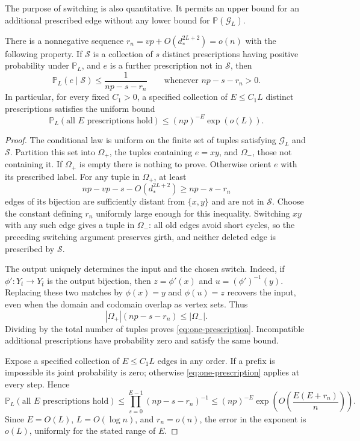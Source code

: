The purpose of switching is also quantitative.  It permits an upper
bound for an additional prescribed edge without any lower bound for
\(\mathbb P(\mathcal G_L)\).

\begin{lemma}\label{lem:prescriptions}
There is a nonnegative sequence
\(r_n=vp+O(d_*^{2L+2})=o(n)\) with the following property.  If
\(\mathcal S\) is a collection of \(s\) distinct prescriptions
having positive probability under \(\mathbb P_L\), and \(e\) is
a further prescription not in \(\mathcal S\), then
\begin{equation}\label{eq:one-prescription}
 \mathbb P_L(e\mid\mathcal S)
 \le\frac1{np-s-r_n}
 \qquad\text{whenever }np-s-r_n>0.
\end{equation}
In particular, for every fixed \(C_1>0\), a specified collection of
\(E\le C_1L\) distinct prescriptions satisfies the uniform bound
\begin{equation}\label{eq:short-prescriptions}
 \mathbb P_L(\text{all }E\text{ prescriptions hold})
 \le (np)^{-E}\exp(o(L)).
\end{equation}
\end{lemma}

\begin{proof}
The conditional law is uniform on the finite set of tuples satisfying
\(\mathcal G_L\) and \(\mathcal S\).  Partition this set into
\(\Omega_+\), the tuples containing \(e=xy\), and \(\Omega_-\),
those not containing it.  If \(\Omega_+\) is empty there is nothing
to prove.  Otherwise orient \(e\) with its prescribed label.
For any tuple in \(\Omega_+\), at least
\[
 np-vp-s-O(d_*^{2L+2})\ge np-s-r_n
\]
edges of its bijection are sufficiently distant from \(\{x,y\}\)
and are not in \(\mathcal S\).  Choose the constant defining \(r_n\)
uniformly large enough for this inequality.  Switching \(xy\) with
any such edge gives a tuple in \(\Omega_-\): all old edges avoid
short cycles, so the preceding switching argument preserves girth,
and neither deleted edge is prescribed by \(\mathcal S\).

The output uniquely determines the input and the chosen switch.
Indeed, if \(\phi'\colon Y_t\to Y_{\bar t}\) is the output
bijection, then \(z=\phi'(x)\) and \(u=(\phi')^{-1}(y)\).
Replacing these two matches by \(\phi(x)=y\) and \(\phi(u)=z\)
recovers the input, even when the domain and codomain overlap as
vertex sets.  Thus
\[
 |\Omega_+|(np-s-r_n)\le |\Omega_-|.
\]
Dividing by the total number of tuples proves
\eqref{eq:one-prescription}.  Incompatible additional prescriptions
have probability zero and satisfy the same bound.

Expose a specified collection of \(E\le C_1L\) edges in any order.
If a prefix is impossible its joint probability is zero; otherwise
\eqref{eq:one-prescription} applies at every step.  Hence
\[
 \mathbb P_L(\text{all }E\text{ prescriptions hold})
 \le\prod_{s=0}^{E-1}(np-s-r_n)^{-1}
 \le (np)^{-E}
       \exp\!\left(O\!\left(\frac{E(E+r_n)}n\right)\right).
\]
Since \(E=O(L)\), \(L=O(\log n)\), and \(r_n=o(n)\), the error
in the exponent is \(o(L)\), uniformly for the stated range of \(E\).
\end{proof}

